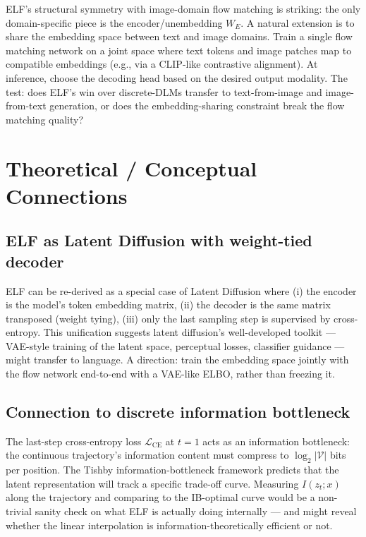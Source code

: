\documentclass[11pt]{article}
\begin{document}
ELF's structural symmetry with image-domain flow matching is striking: the only domain-specific piece is the encoder/unembedding $W_E$. A natural extension is to share the embedding space between text and image domains. Train a single flow matching network on a joint space where text tokens and image patches map to compatible embeddings (e.g., via a CLIP-like contrastive alignment). At inference, choose the decoding head based on the desired output modality. The test: does ELF's win over discrete-DLMs transfer to text-from-image and image-from-text generation, or does the embedding-sharing constraint break the flow matching quality?

\section*{Theoretical / Conceptual Connections}

\subsection*{ELF as Latent Diffusion with weight-tied decoder}

ELF can be re-derived as a special case of Latent Diffusion \citep{rombach2022ldm} where (i) the encoder is the model's token embedding matrix, (ii) the decoder is the same matrix transposed (weight tying), (iii) only the last sampling step is supervised by cross-entropy. This unification suggests latent diffusion's well-developed toolkit --- VAE-style training of the latent space, perceptual losses, classifier guidance --- might transfer to language. A direction: train the embedding space jointly with the flow network end-to-end with a VAE-like ELBO, rather than freezing it.

\subsection*{Connection to discrete information bottleneck}

The last-step cross-entropy loss $\mathcal{L}_\text{CE}$ at $t = 1$ acts as an information bottleneck: the continuous trajectory's information content must compress to $\log_2 |\mathcal{V}|$ bits per position. The Tishby information-bottleneck framework predicts that the latent representation will track a specific trade-off curve. Measuring $I(z_t; x)$ along the trajectory and comparing to the IB-optimal curve would be a non-trivial sanity check on what ELF is actually doing internally --- and might reveal whether the linear interpolation is information-theoretically efficient or not.
\end{document}
